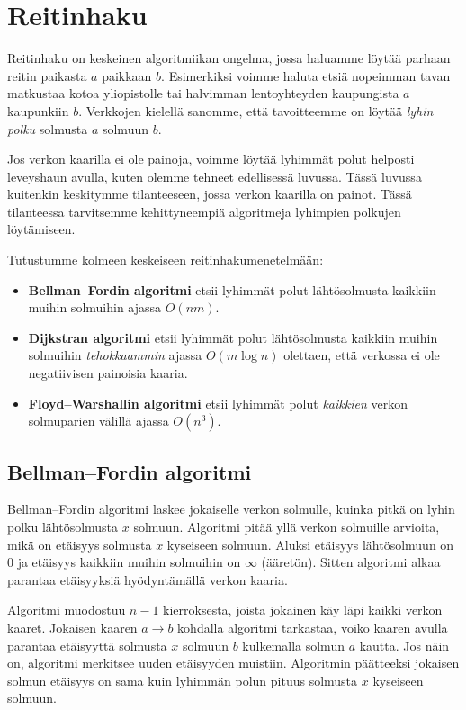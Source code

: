\chapter{Reitinhaku}

Reitinhaku on keskeinen algoritmiikan ongelma, jossa haluamme
löytää parhaan reitin paikasta $a$ paikkaan $b$.
Esimerkiksi voimme haluta etsiä nopeimman tavan
matkustaa kotoa yliopistolle
tai halvimman lentoyhteyden kaupungista $a$
kaupunkiin $b$.
Verkkojen kielellä sanomme, että tavoitteemme on löytää \emph{lyhin polku}
solmusta $a$ solmuun $b$.

Jos verkon kaarilla ei ole painoja,
voimme löytää lyhimmät polut helposti leveyshaun avulla,
kuten olemme tehneet edellisessä luvussa.
Tässä luvussa kuitenkin keskitymme tilanteeseen,
jossa verkon kaarilla on painot.
Tässä tilanteessa tarvitsemme kehittyneempiä algoritmeja
lyhimpien polkujen löytämiseen.

Tutustumme kolmeen keskeiseen reitinhakumenetelmään:

\begin{itemize}
\item \textbf{Bellman–Fordin algoritmi} etsii lyhimmät polut
lähtösolmusta kaikkiin muihin solmuihin ajassa $O(nm)$.
\item \textbf{Dijkstran algoritmi} etsii lyhimmät polut
lähtösolmusta kaikkiin muihin solmuihin \emph{tehokkaammin} ajassa $O(m \log n)$
olettaen, että verkossa ei ole negatiivisen painoisia kaaria.
\item \textbf{Floyd–Warshallin algoritmi} etsii lyhimmät polut
\emph{kaikkien} verkon solmuparien välillä ajassa $O(n^3)$.
\end{itemize}

\section{Bellman–Fordin algoritmi}

Bellman–Fordin algoritmi laskee jokaiselle verkon solmulle,
kuinka pitkä on lyhin polku lähtösolmusta $x$ solmuun.
Algoritmi pitää yllä verkon solmuille arvioita,
mikä on etäisyys solmusta $x$ kyseiseen solmuun.
Aluksi etäisyys lähtösolmuun on 0 ja etäisyys kaikkiin muihin
solmuihin on $\infty$ (ääretön).
Sitten algoritmi alkaa parantaa etäisyyksiä
hyödyntämällä verkon kaaria.

Algoritmi muodostuu $n-1$ kierroksesta, joista jokainen käy läpi
kaikki verkon kaaret.
Jokaisen kaaren $a \rightarrow b$ kohdalla algoritmi tarkastaa,
voiko kaaren avulla parantaa etäisyyttä solmusta $x$ solmuun $b$
kulkemalla solmun $a$ kautta.
Jos näin on, algoritmi merkitsee uuden etäisyyden muistiin.
Algoritmin päätteeksi jokaisen solmun etäisyys on sama kuin
lyhimmän polun pituus solmusta $x$ kyseiseen solmuun.


